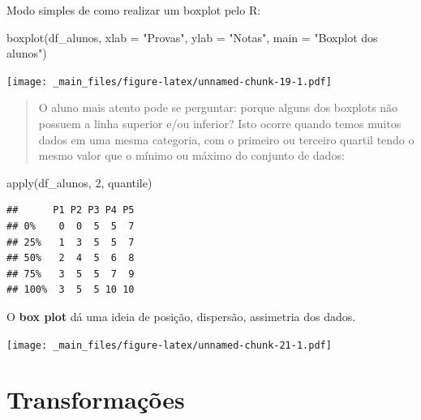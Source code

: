 \documentclass[
]{book}
\newenvironment{Shaded}{\begin{snugshade}}{\end{snugshade}}
\newcommand{\AttributeTok}[1]{\textcolor[rgb]{0.77,0.63,0.00}{#1}}
\newcommand{\DecValTok}[1]{\textcolor[rgb]{0.00,0.00,0.81}{#1}}
\newcommand{\FloatTok}[1]{\textcolor[rgb]{0.00,0.00,0.81}{#1}}
\newcommand{\FunctionTok}[1]{\textcolor[rgb]{0.00,0.00,0.00}{#1}}
\newcommand{\NormalTok}[1]{#1}
\newcommand{\SpecialCharTok}[1]{\textcolor[rgb]{0.00,0.00,0.00}{#1}}
\newcommand{\StringTok}[1]{\textcolor[rgb]{0.31,0.60,0.02}{#1}}
\begin{document}
Modo simples de como realizar um boxplot pelo R:

\begin{Shaded}
\begin{Highlighting}[]
\FunctionTok{boxplot}\NormalTok{(df\_alunos, }\AttributeTok{xlab =} \StringTok{"Provas"}\NormalTok{, }\AttributeTok{ylab =} \StringTok{"Notas"}\NormalTok{,}
        \AttributeTok{main =} \StringTok{"Boxplot dos alunos"}\NormalTok{)}
\end{Highlighting}
\end{Shaded}

\texttt{[image: \_main\_files/figure-latex/unnamed-chunk-19-1.pdf]}

\begin{quote}
O aluno mais atento pode se perguntar: porque alguns dos boxplots não possuem a linha superior e/ou inferior? Isto ocorre quando temos muitos dados em uma mesma categoria, com o primeiro ou terceiro quartil tendo o mesmo valor que o mínimo ou máximo do conjunto de dados:
\end{quote}

\begin{Shaded}
\begin{Highlighting}[]
\FunctionTok{apply}\NormalTok{(df\_alunos, }\DecValTok{2}\NormalTok{, quantile)}
\end{Highlighting}
\end{Shaded}

\begin{verbatim}
##      P1 P2 P3 P4 P5
## 0%    0  0  5  5  7
## 25%   1  3  5  5  7
## 50%   2  4  5  6  8
## 75%   3  5  5  7  9
## 100%  3  5  5 10 10
\end{verbatim}

O \textbf{box plot} dá uma ideia de posição, dispersão, assimetria dos dados.

\begin{Shaded}
\end{Shaded}

\texttt{[image: \_main\_files/figure-latex/unnamed-chunk-21-1.pdf]}

\hypertarget{transformauxe7uxf5es}{%
\section{Transformações}\label{transformauxe7uxf5es}}
\end{document}
